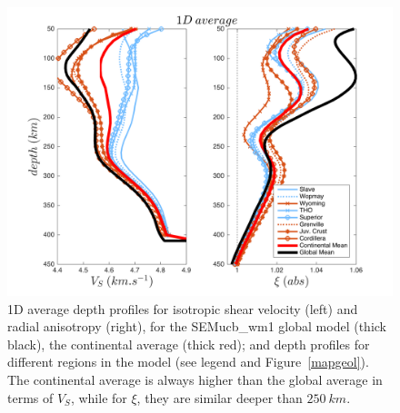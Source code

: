 \documentclass[12pt]{article}
\begin{document}
	\begin{figure}
		\centering
		\includegraphics[width=1\textwidth]{figures/1D_profile_with_regions.png}

		\caption{\baselineskip 18pt 
		1D average depth profiles for isotropic shear velocity (left) and radial anisotropy (right), for the SEMucb\_wm1 global model (thick black), the continental average (thick red); and depth profiles for different regions in the model (see legend and Figure~\ref{mapgeol}). The continental average is always higher than the global average in terms of $V_S$, while for $\xi$, they are similar deeper than $250 \: km$.}
		\label{1daverage}
	\end{figure}


		
\end{document}
